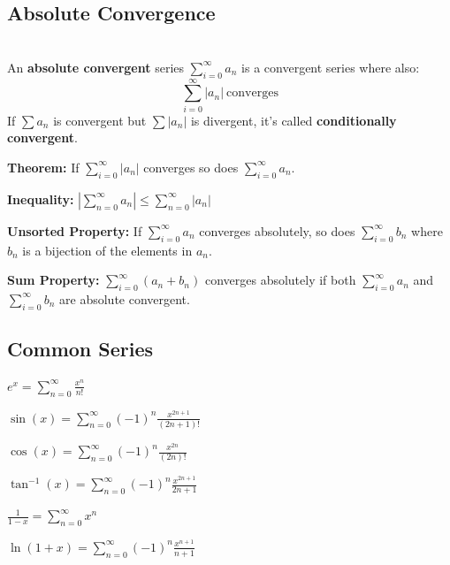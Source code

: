 \documentclass[8pt,a4paper]{extarticle}     %
\theoremstyle{definition}
\theoremstyle{definition}
\theoremstyle{definition}
\begin{document}
\begin{multicols}{4}
\subsection{Absolute Convergence}
\begin{boxdefinition} \ \\
	An \textbf{absolute convergent} series $\sum_{i=0}^\infty a_n$ is a convergent series where also: $$\sum_{i=0}^\infty |a_n|\ \text{converges}$$
	If $\sum a_n$ is convergent but $\sum |a_n|$ is divergent, it's called \textbf{conditionally convergent}.
\end{boxdefinition}
\begin{eqlist}
	\item \textbf{Theorem:} If $\sum_{i=0}^\infty |a_n|$ converges so does $\sum_{i=0}^\infty a_n$.
	\item \textbf{Inequality:} $\left|\sum_{n=0}^\infty a_n \right| \leq \sum_{n=0}^\infty |a_n|$
	\item \textbf{Unsorted Property:} If $\sum_{i=0}^\infty a_n$ converges absolutely, so does $\sum_{i=0}^\infty b_n$ where $b_n$ is a bijection of the elements in $a_n$.
	\item \textbf{Sum Property:} $\sum_{i=0}^\infty (a_n+b_n)$ converges absolutely if both $\sum_{i=0}^\infty a_n$ and $\sum_{i=0}^\infty b_n$ are absolute convergent.
\end{eqlist}

\subsection{Common Series}
\begin{eqlist}
	\item $e^x = \sum_{n=0}^\infty\frac{x^{n}}{n!}$
	\item $\sin(x) = \sum_{n=0}^\infty(-1)^n\frac{x^{2n+1}}{(2n+1)!}$
	\item $\cos(x) = \sum_{n=0}^\infty(-1)^n\frac{x^{2n}}{(2n)!}$
	\item $\tan^{-1}(x) = \sum_{n=0}^\infty(-1)^n\frac{x^{2n+1}}{2n+1}$
	\item $\frac{1}{1-x}= \sum_{n=0}^\infty x^n$
	\item $\ln(1+x) = \sum_{n=0}^\infty (-1)^n\frac{x^{n+1}}{n+1}$
\end{eqlist}

\end{multicols}
\end{document}
